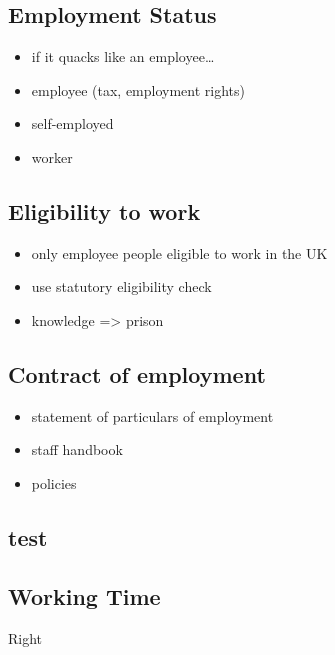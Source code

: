 \subsection{Employment Status}\label{employment-status}

\begin{itemize}
\itemsep1pt\parskip0pt
\item
  if it quacks like an employee\ldots{}
\item
  employee (tax, employment rights)
\item
  self-employed
\item
  worker
\end{itemize}

\subsection{Eligibility to work}\label{eligibility-to-work}

\begin{itemize}
\itemsep1pt\parskip0pt
\item
  only employee people eligible to work in the UK
\item
  use statutory eligibility check
\item
  knowledge =\textgreater{} prison
\end{itemize}

\subsection{Contract of employment}\label{contract-of-employment}

\begin{itemize}
\itemsep1pt\parskip0pt
\item
  statement of particulars of employment
\item
  staff handbook
\item
  policies
\end{itemize}

\subsection{test}\label{test}

\subsection{Working Time}\label{working-time}

Right

